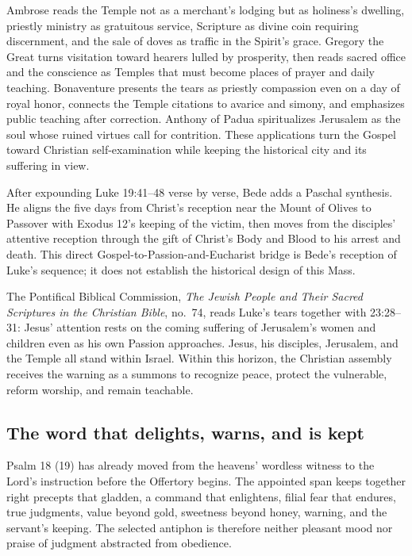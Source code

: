 \begin{deepstudy}
Ambrose reads the Temple not as a merchant's lodging but as holiness's dwelling, priestly ministry as gratuitous service, Scripture as divine coin requiring discernment, and the sale of doves as traffic in the Spirit's grace. Gregory the Great turns visitation toward hearers lulled by prosperity, then reads sacred office and the conscience as Temples that must become places of prayer and daily teaching. Bonaventure presents the tears as priestly compassion even on a day of royal honor, connects the Temple citations to avarice and simony, and emphasizes public teaching after correction. Anthony of Padua spiritualizes Jerusalem as the soul whose ruined virtues call for contrition. These applications turn the Gospel toward Christian self-examination while keeping the historical city and its suffering in view.

After expounding Luke 19:41--48 verse by verse, Bede adds a Paschal synthesis. He aligns the five days from Christ's reception near the Mount of Olives to Passover with Exodus 12's keeping of the victim, then moves from the disciples' attentive reception through the gift of Christ's Body and Blood to his arrest and death. This direct Gospel-to-Passion-and-Eucharist bridge is Bede's reception of Luke's sequence; it does not establish the historical design of this Mass.

The Pontifical Biblical Commission, \emph{The Jewish People and Their Sacred Scriptures in the Christian Bible}, no.~74, reads Luke's tears together with 23:28--31: Jesus' attention rests on the coming suffering of Jerusalem's women and children even as his own Passion approaches. Jesus, his disciples, Jerusalem, and the Temple all stand within Israel. Within this horizon, the Christian assembly receives the warning as a summons to recognize peace, protect the vulnerable, reform worship, and remain teachable.

\sectionguard
\subsection*{The word that delights, warns, and is kept\enspace{}}

Psalm 18 (19) has already moved from the heavens' wordless witness to the Lord's instruction before the Offertory begins. The appointed span keeps together right precepts that gladden, a command that enlightens, filial fear that endures, true judgments, value beyond gold, sweetness beyond honey, warning, and the servant's keeping. The selected antiphon is therefore neither pleasant mood nor praise of judgment abstracted from obedience.


\end{deepstudy}
